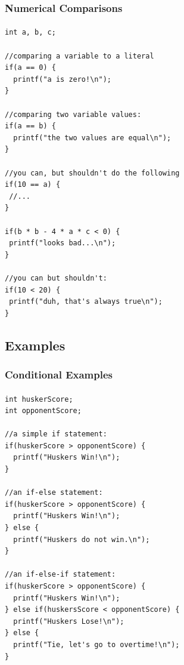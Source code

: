\documentclass[]{beamer}
\begin{document}
\begin{frame}[fragile]
  \frametitle{Numerical Comparisons}
  \framesubtitle{}

\begin{verbatim}
int a, b, c;

//comparing a variable to a literal
if(a == 0) {
  printf("a is zero!\n");
}

//comparing two variable values:
if(a == b) {
  printf("the two values are equal\n");
}

//you can, but shouldn't do the following
if(10 == a) {
 //...
}

if(b * b - 4 * a * c < 0) {
 printf("looks bad...\n");
}

//you can but shouldn't:
if(10 < 20) {
 printf("duh, that's always true\n");
}
\end{verbatim}
\end{frame}

\subsection{Examples}

\begin{frame}[fragile]
  \frametitle{Conditional Examples}
  \framesubtitle{}

\begin{verbatim}
int huskerScore;
int opponentScore;

//a simple if statement:
if(huskerScore > opponentScore) {
  printf("Huskers Win!\n");
}

//an if-else statement:
if(huskerScore > opponentScore) {
  printf("Huskers Win!\n");
} else {
  printf("Huskers do not win.\n");
}

//an if-else-if statement:
if(huskerScore > opponentScore) {
  printf("Huskers Win!\n");
} else if(huskersScore < opponentScore) {
  printf("Huskers Lose!\n");
} else {
  printf("Tie, let's go to overtime!\n");
}
\end{verbatim}
\end{frame}
\end{document}
